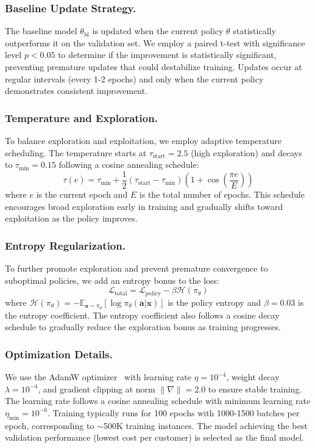 \subsubsection{Baseline Update Strategy.}
The baseline model $\theta_{\text{bl}}$ is updated when the current policy $\theta$ statistically outperforms it on the validation set. We employ a paired t-test with significance level $p < 0.05$ to determine if the improvement is statistically significant, preventing premature updates that could destabilize training. Updates occur at regular intervals (every 1-2 epochs) and only when the current policy demonstrates consistent improvement.

\subsubsection{Temperature and Exploration.}
To balance exploration and exploitation, we employ adaptive temperature scheduling. The temperature starts at $\tau_{\text{start}} = 2.5$ (high exploration) and decays to $\tau_{\text{min}} = 0.15$ following a cosine annealing schedule:
\begin{equation}
\tau(e) = \tau_{\text{min}} + \frac{1}{2}(\tau_{\text{start}} - \tau_{\text{min}})\left(1 + \cos\left(\frac{\pi e}{E}\right)\right)
\end{equation}
where $e$ is the current epoch and $E$ is the total number of epochs. This schedule encourages broad exploration early in training and gradually shifts toward exploitation as the policy improves.

\subsubsection{Entropy Regularization.}
To further promote exploration and prevent premature convergence to suboptimal policies, we add an entropy bonus to the loss:
\begin{equation}
\mathcal{L}_{\text{total}} = \mathcal{L}_{\text{policy}} - \beta \mathcal{H}(\pi_\theta)
\end{equation}
where $\mathcal{H}(\pi_\theta) = -\mathbb{E}_{\mathbf{a} \sim \pi_\theta}[\log \pi_\theta(\mathbf{a}|\mathbf{x})]$ is the policy entropy and $\beta = 0.03$ is the entropy coefficient. The entropy coefficient also follows a cosine decay schedule to gradually reduce the exploration bonus as training progresses.

\subsubsection{Optimization Details.}
We use the AdamW optimizer~\cite{loshchilov2017decoupled} with learning rate $\eta = 10^{-4}$, weight decay $\lambda = 10^{-4}$, and gradient clipping at norm $\|\nabla\| = 2.0$ to ensure stable training. The learning rate follows a cosine annealing schedule with minimum learning rate $\eta_{\text{min}} = 10^{-6}$. Training typically runs for 100 epochs with 1000-1500 batches per epoch, corresponding to $\sim$500K training instances. The model achieving the best validation performance (lowest cost per customer) is selected as the final model.

